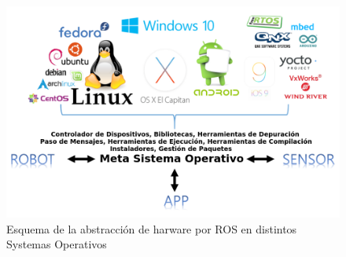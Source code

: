 \documentclass{book}
\begin{document}
\begin{figure}
\centering
\includegraphics[scale=0.5]{images/meta_operating_system.png}
\caption{Esquema de la abstracción de harware por ROS en distintos Systemas Operativos}
\label{fig:meta_operating_system}
\end{figure} 
 
%


\end{document}
